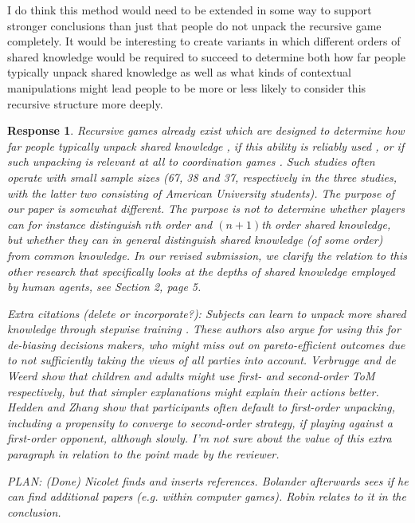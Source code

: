 \documentclass[a4paper]{article}
\newtheorem{response}{Response}
\newenvironment{tobo}{\smallskip \noindent \color{yellow!80!black!80}}{\color{black}\smallskip}
\begin{document}
I do think this method would need to be extended in some way to support stronger conclusions than just that people do not unpack the recursive game completely. It would be interesting to create variants in which different orders of shared knowledge would be required to succeed to determine both how far people typically unpack shared knowledge as well as what kinds of contextual manipulations might lead people to be more or less likely to consider this recursive structure more deeply.

\begin{response} 
Recursive games already exist which are designed to determine how far people typically unpack shared knowledge \cite{flobbe2008children}, if this ability is reliably used \cite{keysar2003limits}, or if such unpacking is relevant at all to  coordination games \cite{curry2012putting}. Such studies often operate with small sample sizes (67, 38 and 37, respectively in the three studies, with the latter two consisting of American University students). The purpose of our paper is somewhat different. The purpose is not to determine whether players can for instance distinguish $n$th order and $(n+1)$th order shared knowledge, but whether they can in general distinguish shared knowledge (of some order) from common knowledge. In our revised submission, we clarify the relation to this other research that specifically looks at the depths of shared knowledge employed by human agents, see Section 2, page 5.


Extra citations (delete or incorporate?): Subjects can learn to unpack more shared knowledge through stepwise training \cite{verbrugge2018stepwise}. These authors also argue for using this for de-biasing decisions makers, who might miss out on pareto-efficient outcomes due to not sufficiently taking the views of all parties into account. Verbrugge and de Weerd \cite{de2018estimating} show that children and adults might use first- and second-order ToM respectively, but that simpler explanations might explain their actions better. Hedden and Zhang \cite{hedden2002you} show that participants often default to first-order unpacking, including a propensity to converge to second-order strategy, if playing against a first-order opponent, although slowly. \begin{tobo}
I'm not sure about the value of this extra paragraph in relation to the point made by the reviewer. 
\end{tobo}


PLAN: (Done) Nicolet finds and inserts references. Bolander afterwards sees if he can find additional papers (e.g. within computer games). Robin relates to it in the conclusion.
\end{response}
\end{document}
